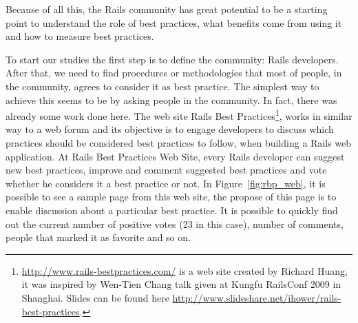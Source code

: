 Because of all this, the Rails community has great potential to be a starting point to understand the role of best practices, 
what benefits come from using it and how to measure best practices.

To start our studies the first step is to define the community: Rails developers. 
After that, we need to find procedures or methodologies that most of people, in the community, agrees to consider it as best practice.
The simplest way to achieve this seems to be by asking people in the community. 
In fact, there was already some work done here.
The web site
\textsf{Rails Best Practices}\footnote{\url{http://www.rails-bestpractices.com/} is a web site created by Richard Huang,
it was inspired by Wen-Tien Chang talk given at Kungfu RailsConf 2009 in Shanghai. Slides can be found here
\url{http://www.slideshare.net/ihower/rails-best-practices}.},
works in similar way to a web forum and its objective is to engage developers to discuss which practices
should be considered best practices to follow, when building a Rails web application.
At Rails Best Practices Web Site, every Rails developer can suggest new best practices,
improve and comment suggested best practices and vote whether he considers it a best practice or not.
In Figure~\ref{fig:rbp_web}, it is possible to see a sample page from this web site, 
the propose of this page is to enable discussion about a particular best practice.
It is possible to quickly find out the current number of positive votes (23 in this case), number of comments, 
people that marked it as favorite  and so on.

